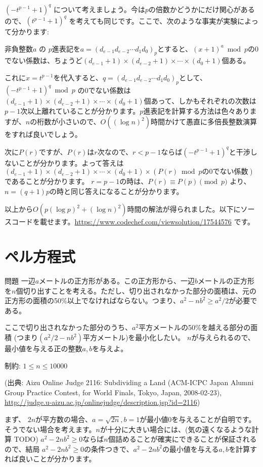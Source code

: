 \documentclass{jsarticle}
\begin{document}
  $(-t^{p-1}+1)^q$ について考えましょう。今は$p$の倍数かどうかにだけ関心があるので、$(t^{p-1}+1)^q$ を考えても同じです。ここで、次のような事実が実験によって分かります:
  \begin{center}
   非負整数$a$ の $p$進表記を$a = (d_{e-1}d_{e-2}\cdots d_1d_0)_p$とすると、$(x+1)^a \bmod p$の0でない係数は、ちょうど$(d_{e-1} + 1) \times (d_{e-2} + 1) \times \cdots \times (d_0 + 1)$個ある。
  \end{center}
  これに$x = t^{p-1}$を代入すると、$q = (d_{e-1}d_{e-2}\cdots d_1d_0)_p$として、
  $(-t^{p-1}+1)^q \bmod p$ の0でない係数は$(d_{e-1} + 1) \times (d_{e-2} + 1) \times \cdots \times (d_0 + 1)$個あって、しかもそれぞれの次数は$p-1$次以上離れていることが分かります。$p$進表記を計算する方法は色々ありますが、$n$の桁数が小さいので、$O((\log n)^2)$時間かけて愚直に多倍長整数演算をすれば良いでしょう。

  次に$P(r)$ですが、$P(r)$は$r$次なので、$r < p - 1$ならば$(-t^{p-1}+1)^q$と干渉しないことが分かります。よって答えは$(d_{e-1} + 1) \times (d_{e-2} + 1) \times \cdots \times (d_0 + 1) \times (P(r)\bmod p\mbox{の0でない係数})$であることが分かります。
  $r = p - 1$の時は、$P(r) \equiv P(p) \pmod p$ より、$n = (q + 1)p$の時と同じ答えになることが分かります。

  以上から$O(p(\log p)^2 + (\log n)^2)$時間の解法が得られました。以下にソースコードを載せます。\url{https://www.codechef.com/viewsolution/17544576} です。
  
 \section{ペル方程式}
 \label{sec:pells-equation}
 \begin{itembox}{問題}
  一辺$a$メートルの正方形がある。この正方形から、一辺$b$メートルの正方形を$n$個切り出すことを考える。ただし、切り出されなかった部分の面積は、元の正方形の面積の50\%以上でなければならない。つまり、$a^2-nb^2 \ge a^2/2$が必要である。

  ここで切り出されなかった部分のうち、$a^2$平方メートルの50\%を越える部分の面積
  (つまり$(a^2/2-nb^2)$平方メートル)を最小化したい。
  $n$が与えられるので、最小値を与える正の整数$a,b$を与えよ。

  制約: $1 \le n \le 10000$

  (出典: Aizu Online Judge 2116: Subdividing a Land (ACM-ICPC Japan Alumni Group Practice Contest, for World Finals, Tokyo, Japan, 2008-02-23),
  \url{http://judge.u-aizu.ac.jp/onlinejudge/description.jsp?id=2116})
 \end{itembox}
 まず、 $2n$が平方数の場合、$a = \sqrt{2n},b=1$が最小値0を与えることが自明です。
 そうでない場合を考えます。$n$が十分に大きい場合には、(気の遠くなるような計算 TODO) $a^2 - 2nb^2 \ge 0$ならば$n$個詰めることが確実にできることが保証されるので、結局 $a^2 - 2nb^2 \ge 0$の条件つきで、$a^2 - 2nb^2$の最小値を与える$a,b$を計算すれば良いことが分かります。
\end{document}
